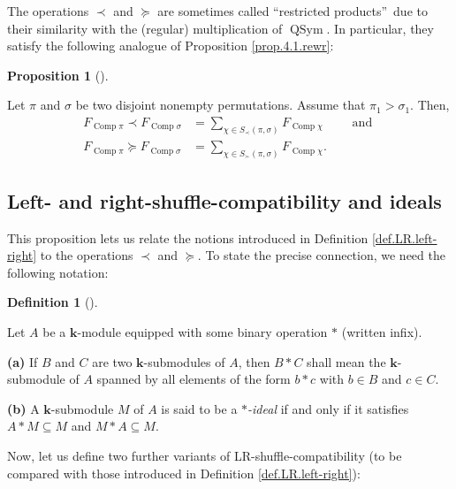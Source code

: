 \documentclass[numbers=enddot,12pt,final,onecolumn,notitlepage]{scrartcl}%
\theoremstyle{definition}
\newtheorem{prop}[theo]{Proposition}
\newenvironment{proposition}[1][]
{\begin{prop}[#1]\begin{leftbar}}
{\end{leftbar}\end{prop}}
\newtheorem{defi}[theo]{Definition}
\newenvironment{definition}[1][]
{\begin{defi}[#1]\begin{leftbar}}
{\end{leftbar}\end{defi}}
\newenvironment{vershort}{}{}
\let\sumnonlimits\sum
\renewcommand{\sum}{\sumnonlimits\limits}
\begin{document}
\begin{vershort}
The operations $\left.  \prec\right.  $ and $\left.  \succeq\right.  $ are
sometimes called \textquotedblleft restricted products\textquotedblright\ due
to their similarity with the (regular) multiplication of $\operatorname*{QSym}%
$. In particular, they satisfy the following analogue of Proposition
\ref{prop.4.1.rewr}:

\begin{proposition}
Let $\pi$ and $\sigma$ be two disjoint nonempty permutations. Assume that
$\pi_{1}>\sigma_{1}$. Then,%
\begin{align*}
F_{\operatorname*{Comp}\pi}\left.  \prec\right.  F_{\operatorname*{Comp}%
\sigma}
&=\sum_{\chi\in S_{\prec}\left(  \pi,\sigma\right)  }%
F_{\operatorname*{Comp}\chi}  \qquad \text{ and } \\
F_{\operatorname*{Comp}\pi}\left.  \succeq\right.  F_{\operatorname*{Comp}%
\sigma}
&=\sum_{\chi\in S_{\succ}\left(  \pi,\sigma\right)  }%
F_{\operatorname*{Comp}\chi}.
\end{align*}

\end{proposition}

\subsection{Left- and right-shuffle-compatibility and ideals}

This proposition lets us relate the notions introduced in Definition
\ref{def.LR.left-right} to the operations $\left.  \prec\right.  $ and
$\left.  \succeq\right.  $. To state the precise connection, we need the
following notation:

\begin{definition}
Let $A$ be a $\mathbf{k}$-module equipped with some binary operation $\ast$
(written infix).

\textbf{(a)} If $B$ and $C$ are two $\mathbf{k}$-submodules of $A$, then
$B\ast C$ shall mean the $\mathbf{k}$-submodule of $A$ spanned by all elements
of the form $b\ast c$ with $b\in B$ and $c\in C$.

\textbf{(b)} A $\mathbf{k}$-submodule $M$ of $A$ is said to be a\textit{
}$\ast$\textit{-ideal} if and only if it satisfies $A\ast M\subseteq M$ and
$M\ast A\subseteq M$.
\end{definition}

Now, let us define two further variants of LR-shuffle-compatibility (to be
compared with those introduced in Definition \ref{def.LR.left-right}):


\end{vershort}
\end{document}
